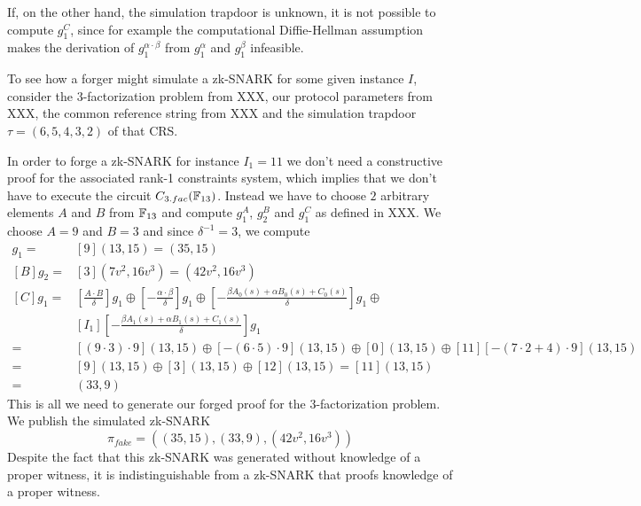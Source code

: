 If, on the other hand, the simulation trapdoor is unknown, it is not possible to compute $g_1^C$, since for example the computational Diffie-Hellman assumption makes the derivation of $g_1^{\alpha\cdot \beta}$ from $g_1^\alpha$ and $g_1^\beta$ infeasible.
\begin{example} To see how a forger might simulate a  
zk-SNARK for some given instance $I$, consider the $3$-factorization problem from XXX, our protocol parameters from XXX, the common reference string from XXX and the simulation trapdoor $\tau = (6,5,4,3,2)$ of that CRS.

In order to forge a zk-SNARK for instance $I_1=11$ we don't need a constructive proof for the associated rank-1 constraints system, which implies that we don't have to execute the circuit $C_{3.fac}(\mathbb{F}_{13})$. Instead we have to choose $2$ arbitrary elements $A$ and $B$ from $\mathbb{F}_{13}$ and compute $g_1^A$, $g_2^B$ and $g_1^C$ as defined in XXX. We choose $A=9$ and $B=3$ and since $\delta^{-1}=3$, we compute
\begin{align*}
[A]g_1 =& [9](13,15) = (35,15)\\
[B]g_2 =& [3](7v^2,16v^3) = (42v^2,16v^3)\\
[C]g_1 =& [\frac{A\cdot B}{\delta}]g_1\oplus 
           [-\frac{\alpha\cdot\beta}{\delta}]g_1\oplus 
      [-\frac{\beta A_0(s) + \alpha B_0(s)+ C_0(s)}{\delta}]g_1\oplus\\
      &[I_1][-\frac{\beta A_1(s) + \alpha B_1(s)+ C_1(s)}{\delta}]g_1\\      
     = & [(9\cdot 3)\cdot 9 ](13,15)\oplus 
      [-(6\cdot 5)\cdot 9](13,15)\oplus 
      [0](13,15)\oplus 
      [11][-(7\cdot 2 + 4)\cdot 9](13,15)\\      
     = &[9](13,15)\oplus [3](13,15)\oplus [12](13,15)= [11](13,15)\\       
     = &(33,9)
\end{align*}
This is all we need to generate our forged proof for the $3$-factorization problem. We publish the simulated zk-SNARK
$$
\pi_{fake}=((35,15),(33,9),(42v^2,16v^3))
$$
Despite the fact that this zk-SNARK was generated without knowledge of a proper witness, it is indistinguishable from a zk-SNARK that proofs knowledge of a proper witness. 


\end{example}
